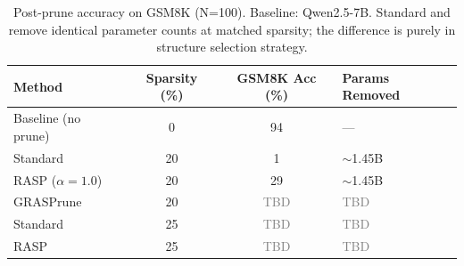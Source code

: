\begin{table}[t]
\centering
\caption{Post-prune accuracy on GSM8K (N=100). Baseline: Qwen2.5-7B. Standard and \rasp{} remove identical parameter counts at matched sparsity; the difference is purely in structure selection strategy.}
\label{tab:postprune}
\begin{tabular}{l S[table-format=2.0] S[table-format=2.0] l}
\toprule
{Method} & {Sparsity (\%)} & {GSM8K Acc (\%)} & {Params Removed} \\
\midrule
Baseline (no prune) & 0  & 94 & {---} \\
Standard            & 20 & 1  & {${\sim}$1.45B} \\
RASP ($\alpha{=}1.0$) & 20 & 29 & {${\sim}$1.45B} \\
GRASPrune           & 20 & \textcolor{gray}{TBD} & \textcolor{gray}{TBD} \\
\midrule
Standard            & 25 & \textcolor{gray}{TBD} & \textcolor{gray}{TBD} \\
RASP                & 25 & \textcolor{gray}{TBD} & \textcolor{gray}{TBD} \\
\bottomrule
\end{tabular}
\end{table}
